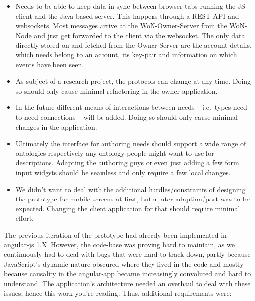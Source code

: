 \begin{itemize}
\item
  Needs to be able to keep data in sync between browser-tabs running the
  JS-client and the Java-based server. This happens through a REST-API
  and websockets. Most messages arrive at the WoN-Owner-Server from the
  WoN-Node and just get forwarded to the client via the websocket. The
  only data directly stored on and fetched from the Owner-Server are the
  account details, which needs belong to an account, its key-pair and
  information on which events have been seen.
\item
  As subject of a research-project, the protocols can change at any
  time. Doing so should only cause minimal refactoring in the
  owner-application.
\item
  In the future different means of interactions between needs --
  i.e.~types need-to-need connections -- will be added. Doing so should
  only cause minimal changes in the application.
\item
  Ultimately the interface for authoring needs should support a wide
  range of ontologies respectively any ontology people might want to use
  for descriptions. Adapting the authoring guys or even just adding a
  few form input widgets should be seamless and only require a few local
  changes.
\item
  We didn't want to deal with the additional hurdles/constraints of
  designing the prototype for mobile-screens at first, but a later
  adaption/port was to be expected. Changing the client application for
  that should require minimal effort.
\end{itemize}


The previous iteration of the prototype had already been implemented in
angular-js 1.X. However, the code-base was proving hard to maintain, as
we continuously had to deal with bugs that were hard to track down,
partly because JavaScript's dynamic nature obscured where they lived in
the code and mostly because causality in the angular-app became
increasingly convoluted and hard to understand. The application's
architecture needed an overhaul to deal with these issues, hence this
work you're reading. Thus, additional requirements were:

